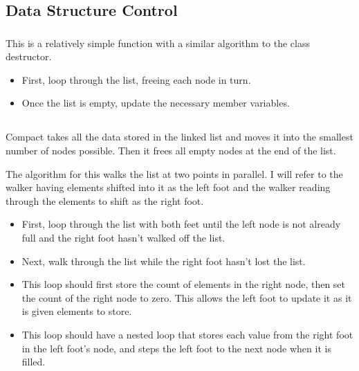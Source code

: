 \subsection{Data Structure Control}

\subsubsection{}
\indent This is a relatively simple function with a similar algorithm to the
class destructor.

\begin{itemize}
	\item First, loop through the list, freeing each node in turn.
	\item Once the list is empty, update the necessary member variables.
\end{itemize}

\subsection{}
\indent Compact takes all the data stored in the linked list and moves it into the
smallest number of nodes possible. Then it frees all empty nodes at the
end of the list.

The algorithm for this walks the list at two points in parallel. I will
refer to the walker having elements shifted into it as the left foot and
the walker reading through the elements to shift as the right foot.

\begin{itemize}
	\item First, loop through the list with both feet until the left node is not
	      already full and the right foot hasn't walked off the list.
	\item Next, walk through the list while the right foot hasn't lost the list.

	\item This loop should first store the count of elements in the right node,
	      then set the count of the right node to zero. This allows the left foot
	      to update it as it is given elements to store.
	\item This loop should have a nested loop that stores each value from the right
	      foot in the left foot's node, and steps the left foot to the next node
	      when it is filled.
\end{itemize}


\pagebreak

